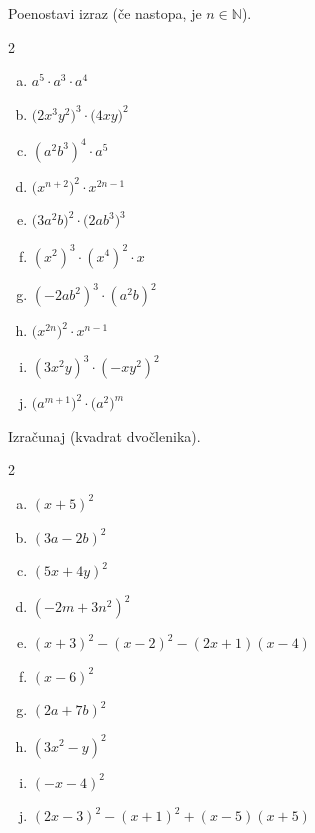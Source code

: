 \documentclass[a4paper,12pt]{letter}
\newcounter{tocke}
\begin{document}
\begin{naloga}[\hfill $\tockeB$] \addtocounter{tocke}{\numexpr\tockeB\relax}
Poenostavi izraz (\v{c}e nastopa, je $n\in\mathbb{N}$).
\begin{multicols}{2}
\begin{enumerate}[a)]
\item $\displaystyle a^5\cdot a^{3}\cdot a^{4}$
\item $\displaystyle \big(2x^3y^{2}\big)^{3}\cdot\big(4xy\big)^{2}$
\item $\displaystyle (a^{2}b^{3})^{4}\cdot a^{5}$
\item $\displaystyle \big(x^{n+2}\big)^{2}\cdot x^{2n-1}$
\item $\displaystyle \big(3a^{2}b\big)^{2}\cdot\big(2ab^{3}\big)^{3}$
\end{enumerate}
\columnbreak
\begin{enumerate}[a)]\setcounter{enumi}{5}
\item $\displaystyle (x^2)^3\cdot(x^4)^2\cdot x$
\item $\displaystyle (-2ab^2)^3\cdot(a^2b)^2$
\item $\displaystyle \big(x^{2n}\big)^{2}\cdot x^{n-1}$
\item $\displaystyle (3x^2y)^3\cdot(-xy^2)^2$
\item $\displaystyle \big(a^{m+1}\big)^{2}\cdot\big(a^{2}\big)^{m}$
\end{enumerate}
\end{multicols}
\end{naloga}

\begin{naloga}[\hfill $\tockeC$] \addtocounter{tocke}{\numexpr\tockeC\relax}
Izra\v{c}unaj (kvadrat dvo\v{c}lenika).
\begin{multicols}{2}
\begin{enumerate}[a)]
\item $\displaystyle (x+5)^2$
\item $\displaystyle (3a-2b)^2$
\item $\displaystyle (5x+4y)^2$
\item $\displaystyle (-2m+3n^2)^2$
\item $\displaystyle (x+3)^2-(x-2)^2-(2x+1)(x-4)$
\end{enumerate}
\columnbreak
\begin{enumerate}[a)]\setcounter{enumi}{5}
\item $\displaystyle (x-6)^2$
\item $\displaystyle (2a+7b)^2$
\item $\displaystyle (3x^2-y)^2$
\item $\displaystyle (-x-4)^2$
\item $\displaystyle (2x-3)^2-(x+1)^2+(x-5)(x+5)$
\end{enumerate}
\end{multicols}
\end{naloga}
\newpage
\end{document}
